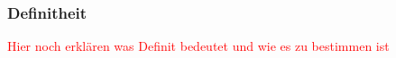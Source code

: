 \subsubsection{Definitheit}
\textcolor{red}{Hier noch erklären was Definit bedeutet und wie es zu bestimmen ist}